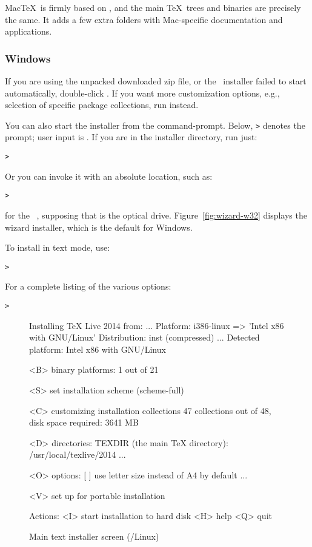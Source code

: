 \documentclass{article}
\begin{document}
Mac\TeX\ is firmly based on \TL, and the main \TeX\ trees and binaries
are precisely the same.  It adds a few extra folders with Mac-specific
documentation and applications.


\subsubsection{Windows}\label{sec:wininst}

If you are using the unpacked downloaded zip file, or the \DVD\
installer failed to start automatically, double-click
.  If you want more customization
options, e.g., selection of specific package collections, run
 instead.

You can also start the installer from the command-prompt.  Below,
\texttt{>} denotes the prompt; user input is \Ucom{\texttt{bold}}.  If
you are in the installer directory, run just:
\begin{alltt}
> 
\end{alltt}

Or you can invoke it with an absolute location, such as:
\begin{alltt}
> 
\end{alltt}
for the \TK\ \DVD, supposing that  is the optical
drive. Figure~\ref{fig:wizard-w32} displays the wizard installer, which
is the default for Windows.

To install in text mode, use:
\begin{alltt}
> 
\end{alltt}

For a complete listing of the various options:
\begin{alltt}
> 
\end{alltt}

\begin{figure}[tb]
\begin{boxedverbatim}
Installing TeX Live 2014 from: ...
Platform: i386-linux => 'Intel x86 with GNU/Linux'
Distribution: inst (compressed)
...
 Detected platform: Intel x86 with GNU/Linux
 
 <B> binary platforms: 1 out of 21

 <S> set installation scheme (scheme-full)

 <C> customizing installation collections
     47 collections out of 48, disk space required: 3641 MB

 <D> directories:
   TEXDIR (the main TeX directory):
     /usr/local/texlive/2014
   ...

 <O> options:
   [ ] use letter size instead of A4 by default
   ...
 
 <V> set up for portable installation

Actions:
 <I> start installation to hard disk
 <H> help
 <Q> quit
\end{boxedverbatim}
\caption{Main text installer screen (\GNU/Linux)}\label{fig:text-main}
\end{figure}
\end{document}
